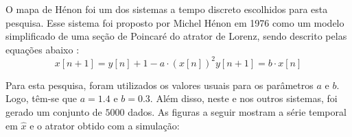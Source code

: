 \documentclass[10pt, technote]{article}
\begin{document}
O mapa de Hénon foi um dos sistemas a tempo discreto escolhidos para esta pesquisa. Esse sistema foi proposto por Michel Hénon em 1976 como um modelo simplificado de uma seção de Poincaré do atrator de Lorenz, sendo descrito pelas equações abaixo \cite{henon1976two}:
\begin{subequations}
\begin{equation}
x[n+1] = y[n] + 1 - a\cdot (x[n])^2
\end{equation}
\begin{equation}
y[n+1] = b \cdot x[n]
\end{equation}
\end{subequations}

Para esta pesquisa, foram utilizados os valores usuais para os parâmetros $a$ e $b$. Logo, têm-se que $a = 1.4$ e $b = 0.3$. Além disso, neste e nos outros sistemas, foi gerado um conjunto de $5000$ dados. As figuras a seguir mostram a série temporal em $\hat{x}$ e o atrator obtido com a simulação:
\end{document}
